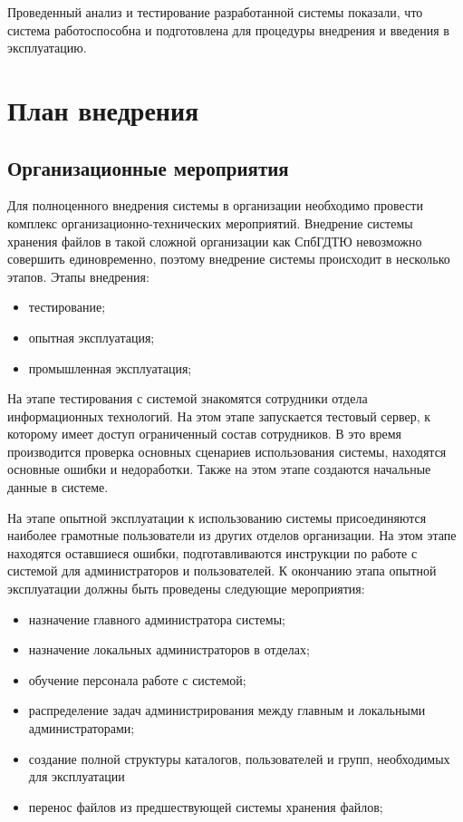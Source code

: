 \documentclass[utf8,usehyperref,12pt]{G7-32}
\begin{document}
Проведенный анализ и тестирование разработанной системы показали, что система работоспособна и подготовлена для процедуры внедрения и введения в  эксплуатацию.

\section{План внедрения}
\subsection{Организационные мероприятия}
Для полноценного внедрения системы в организации необходимо провести комплекс организационно-технических мероприятий. Внедрение системы хранения файлов в такой сложной организации как СпбГДТЮ невозможно совершить единовременно, поэтому внедрение системы происходит в несколько этапов. Этапы внедрения:
\begin{itemize}
 \item тестирование;
 \item опытная эксплуатация;
 \item промышленная эксплуатация;
\end{itemize}

На этапе тестирования с системой знакомятся сотрудники отдела информационных технологий. На этом этапе запускается тестовый сервер, к которому имеет доступ ограниченный состав сотрудников. В это время производится проверка основных сценариев использования системы, находятся основные ошибки и недоработки. Также на этом этапе создаются начальные данные в системе.

На этапе опытной эксплуатации к использованию системы присоединяются наиболее грамотные пользователи из других отделов организации. На этом этапе находятся оставшиеся ошибки, подготавливаются инструкции по работе с системой для администраторов и пользователей. К окончанию этапа опытной эксплуатации должны быть проведены следующие мероприятия:

\begin{itemize}
 \item назначение главного администратора системы;
 \item назначение локальных администраторов в отделах;
 \item обучение персонала работе с системой;
 \item распределение задач администрирования между главным и локальными администраторами;
 \item создание полной структуры каталогов, пользователей и групп, необходимых для эксплуатации
 \item перенос файлов из предшествующей системы хранения файлов;
\end{itemize}
\end{document}
